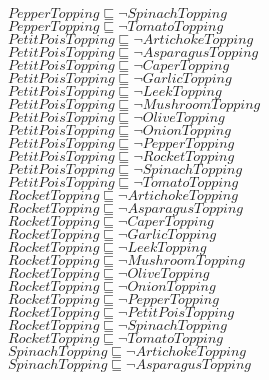 \documentclass[a4paper,10pt]{article}
\begin{document}
 $PepperTopping \sqsubseteq  \lnot SpinachTopping$\\ 
 $PepperTopping \sqsubseteq  \lnot TomatoTopping$\\ 
 $PetitPoisTopping \sqsubseteq  \lnot ArtichokeTopping$\\ 
 $PetitPoisTopping \sqsubseteq  \lnot AsparagusTopping$\\ 
 $PetitPoisTopping \sqsubseteq  \lnot CaperTopping$\\ 
 $PetitPoisTopping \sqsubseteq  \lnot GarlicTopping$\\ 
 $PetitPoisTopping \sqsubseteq  \lnot LeekTopping$\\ 
 $PetitPoisTopping \sqsubseteq  \lnot MushroomTopping$\\ 
 $PetitPoisTopping \sqsubseteq  \lnot OliveTopping$\\ 
 $PetitPoisTopping \sqsubseteq  \lnot OnionTopping$\\ 
 $PetitPoisTopping \sqsubseteq  \lnot PepperTopping$\\ 
 $PetitPoisTopping \sqsubseteq  \lnot RocketTopping$\\ 
 $PetitPoisTopping \sqsubseteq  \lnot SpinachTopping$\\ 
 $PetitPoisTopping \sqsubseteq  \lnot TomatoTopping$\\ 
 $RocketTopping \sqsubseteq  \lnot ArtichokeTopping$\\ 
 $RocketTopping \sqsubseteq  \lnot AsparagusTopping$\\ 
 $RocketTopping \sqsubseteq  \lnot CaperTopping$\\ 
 $RocketTopping \sqsubseteq  \lnot GarlicTopping$\\ 
 $RocketTopping \sqsubseteq  \lnot LeekTopping$\\ 
 $RocketTopping \sqsubseteq  \lnot MushroomTopping$\\ 
 $RocketTopping \sqsubseteq  \lnot OliveTopping$\\ 
 $RocketTopping \sqsubseteq  \lnot OnionTopping$\\ 
 $RocketTopping \sqsubseteq  \lnot PepperTopping$\\ 
 $RocketTopping \sqsubseteq  \lnot PetitPoisTopping$\\ 
 $RocketTopping \sqsubseteq  \lnot SpinachTopping$\\ 
 $RocketTopping \sqsubseteq  \lnot TomatoTopping$\\ 
 $SpinachTopping \sqsubseteq  \lnot ArtichokeTopping$\\ 
 $SpinachTopping \sqsubseteq  \lnot AsparagusTopping$\\ 
\end{document}
